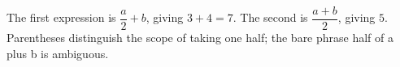 The first expression is $\dfrac{a}{2}+b $, giving $ 3+4=\boxed7 $. The second is $\dfrac{a+b}{2}$, giving $\boxed5 $. Parentheses distinguish the scope of taking one half; the bare phrase half of a plus b is ambiguous.
